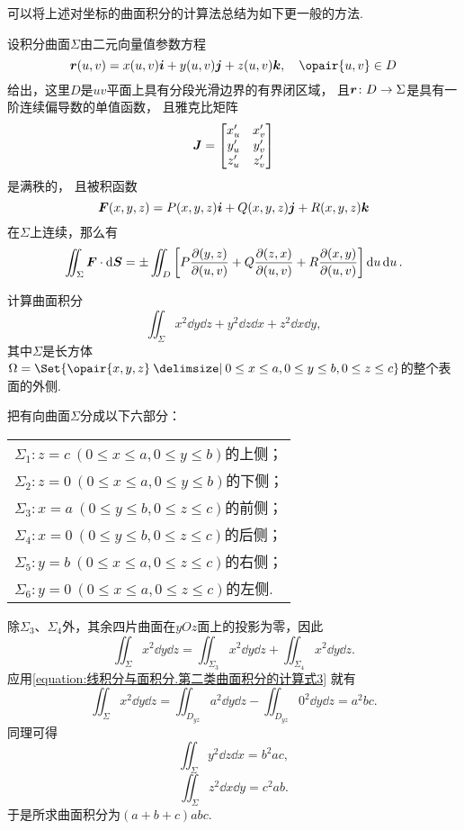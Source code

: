 可以将上述对坐标的曲面积分的计算法总结为如下更一般的方法.
\begin{theorem}
设积分曲面\(\Sigma\)由二元向量值参数方程\[
\mat{r}(u,v) = x(u,v) \mat{i} + y(u,v) \mat{j} + z(u,v) \mat{k},
\quad \opair{u,v} \in D
\]给出，这里\(D\)是\(uv\)平面上具有分段光滑边界的有界闭区域，
且\(\boldsymbol{r}\colon D \to \Sigma\)是具有一阶连续偏导数的单值函数，
且雅克比矩阵\[
\boldsymbol{J} = \begin{bmatrix}
x'_u & x'_v \\
y'_u & y'_v \\
z'_u & z'_v
\end{bmatrix}
\]是满秩的，
且被积函数\[
\boldsymbol{F}(x,y,z) = P(x,y,z) \boldsymbol{i} + Q(x,y,z) \boldsymbol{j} + R(x,y,z) \boldsymbol{k}
\]在\(\Sigma\)上连续，那么有\[
\iint_{\Sigma} \boldsymbol{F} \cdot \dd{\boldsymbol{S}}
= \pm \iint_D \left[
	P \pdv{ (y,z) }{ (u,v) }
	+ Q \pdv{ (z,x) }{ (u,v) }
	+ R \pdv{ (x,y) }{ (u,v) }
\right] \dd{u}\dd{u}.
\]
\end{theorem}

\begin{example}
计算曲面积分\[
\iint_{\Sigma} x^2 \dd{y}\dd{z} + y^2 \dd{z}\dd{x} + z^2 \dd{x}\dd{y},
\]其中\(\Sigma\)是长方体\(\Omega = \Set{
\opair{x,y,z} \given
0 \leq x \leq a,
0 \leq y \leq b,
0 \leq z \leq c
}\)的整个表面的外侧.
\begin{solution}
把有向曲面\(\Sigma\)分成以下六部分：
\begin{center}\begin{tabular}{l}
\(\Sigma_1: z=c\ (0 \leq x \leq a, 0 \leq y \leq b)\)的上侧； \\
\(\Sigma_2: z=0\ (0 \leq x \leq a, 0 \leq y \leq b)\)的下侧； \\
\(\Sigma_3: x=a\ (0 \leq y \leq b, 0 \leq z \leq c)\)的前侧； \\
\(\Sigma_4: x=0\ (0 \leq y \leq b, 0 \leq z \leq c)\)的后侧； \\
\(\Sigma_5: y=b\ (0 \leq x \leq a, 0 \leq z \leq c)\)的右侧； \\
\(\Sigma_6: y=0\ (0 \leq x \leq a, 0 \leq z \leq c)\)的左侧. \\
\end{tabular}\end{center}
除\(\Sigma_3\)、\(\Sigma_4\)外，其余四片曲面在\(yOz\)面上的投影为零，因此\[
\iint_{\Sigma} x^2 \dd{y}\dd{z}
= \iint_{\Sigma_3} x^2 \dd{y}\dd{z}
+ \iint_{\Sigma_4} x^2 \dd{y}\dd{z}.
\]应用\cref{equation:线积分与面积分.第二类曲面积分的计算式3} 就有\[
\iint_{\Sigma} x^2 \dd{y}\dd{z}
= \iint_{D_{yz}} a^2 \dd{y}\dd{z}
- \iint_{D_{yz}} 0^2 \dd{y}\dd{z}
= a^2 bc.
\]同理可得\[
\iint_{\Sigma} y^2 \dd{z}\dd{x}
= b^2 ac,
\]\[
\iint_{\Sigma} z^2 \dd{x}\dd{y}
= c^2 ab.
\]于是所求曲面积分为\((a+b+c) abc\).
\end{solution}
\end{example}

